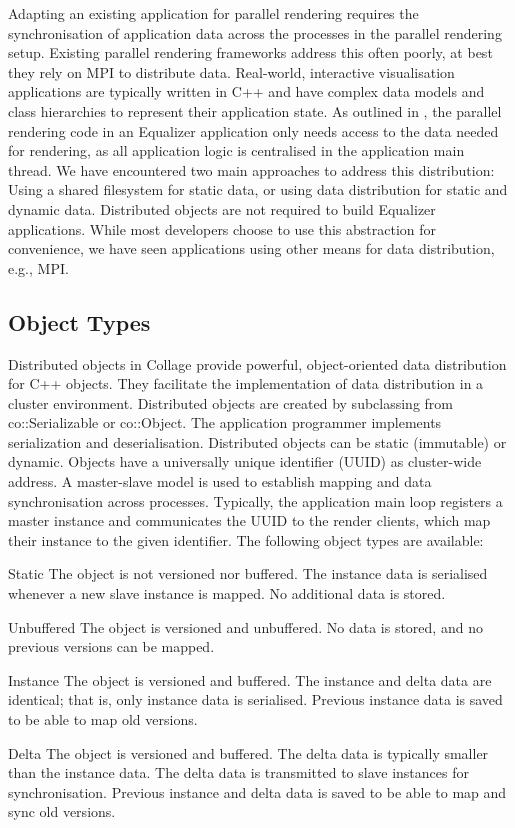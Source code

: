 Adapting an existing application for parallel rendering requires the
synchronisation of application data across the processes in the parallel
rendering setup. Existing parallel rendering frameworks address this often
poorly, at best they rely on MPI to distribute data. Real-world, interactive
visualisation applications are typically written in C++ and have complex data
models and class hierarchies to represent their application state. As outlined
in \cite{EMP:09}, the parallel rendering code in an \textsf{Equalizer}
application only needs access to the data needed for rendering, as all
application logic is centralised in the application main thread. We have
encountered two main approaches to address this distribution: Using a shared
filesystem for static data, or using data distribution for static and dynamic
data. Distributed objects are not required to build \textsf{Equalizer}
applications. While most developers choose to use this abstraction for
convenience, we have seen applications using other means for data distribution,
e.g., MPI.

\subsection{Object Types}

Distributed objects in \textsf{Collage} provide powerful, object-oriented data
distribution for C++ objects. They facilitate the implementation of data
distribution in a cluster environment. Distributed objects are created by
subclassing from \textsf{co::Serializable} or \textsf{co::Object}. The
application programmer implements serialization and deserialisation. Distributed
objects can be static (immutable) or dynamic. Objects have a universally unique
identifier (UUID) as cluster-wide address. A master-slave model is used to
establish mapping and data synchronisation across processes. Typically, the
application main loop registers a master instance and communicates the UUID to
the render clients, which map their instance to the given identifier. The
following object types are available:

\begin{compactdesc}
\item[Static] The object is not versioned nor buffered. The instance data is
  serialised whenever a new slave instance is mapped. No additional data is
  stored.
\item[Unbuffered] The object is versioned and unbuffered. No data is stored, and
  no previous versions can be mapped.
\item[Instance] The object is versioned and buffered. The instance and delta
  data are identical; that is, only instance data is serialised. Previous
  instance data is saved to be able to map old versions.
\item[Delta] The object is versioned and buffered. The delta data is typically
  smaller than the instance data. The delta data is transmitted to slave
  instances for synchronisation. Previous instance and delta data is saved to be
  able to map and sync old versions.
\end{compactdesc}

